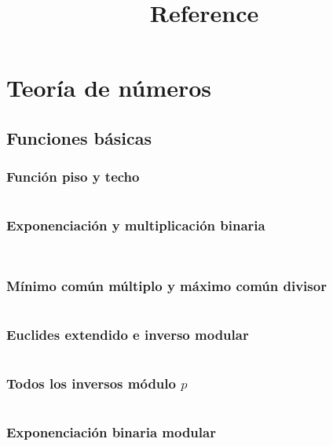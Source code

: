 \documentclass[11pt]{article}
\title{Reference}
\begin{document}
	\tableofcontents
	
	\clearpage
	\section{Teoría de números}
		\subsection{Funciones básicas}
			\subsubsection{Función piso y techo}
			\inputminted[tabsize=2,breaklines,firstline=5,lastline=21,fontsize=\small]{c++}{numberTheory.cpp}
			
			\subsubsection{Exponenciación y multiplicación binaria}
			\inputminted[tabsize=2,breaklines,firstline=23,lastline=46,fontsize=\small]{c++}{numberTheory.cpp}
			\inputminted[tabsize=2,breaklines,firstline=1041,lastline=1047,fontsize=\small]{c++}{numberTheory.cpp}
			
			\subsubsection{Mínimo común múltiplo y máximo común divisor}
			\inputminted[tabsize=2,breaklines,firstline=48,lastline=68,fontsize=\small]{c++}{numberTheory.cpp}
			
			\subsubsection{Euclides extendido e inverso modular}
			\inputminted[tabsize=2,breaklines,firstline=70,lastline=85,fontsize=\small]{c++}{numberTheory.cpp}
			
			\subsubsection{Todos los inversos módulo $p$}
			\inputminted[tabsize=2,breaklines,firstline=711,lastline=718,fontsize=\small]{c++}{numberTheory.cpp}
			
			\subsubsection{Exponenciación binaria modular}
			\inputminted[tabsize=2,breaklines,firstline=93,lastline=106,fontsize=\small]{c++}{numberTheory.cpp}
			
\end{document}
